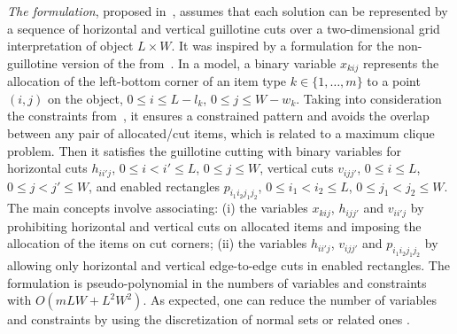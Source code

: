 \emph{The {\modelGrid} formulation}, proposed in~\citet{martin:2020}, assumes that each solution can be represented by a sequence of horizontal and vertical guillotine cuts over a two-dimensional grid interpretation of object $L \times W$.
It was inspired by a formulation for the non-guillotine version of the {\myproblem} from~\citet{beasley:1985:nonguillotine}.
In a {\modelGrid} model, a binary variable $x_{kij}$ represents the allocation of the left-bottom corner of an item type $k \in \{1,\ldots,m\}$ to a point $(i,j)$ on the object, $0 \leq i \leq L-l_k$, $0 \leq j \leq W-w_k$.
Taking into consideration the constraints from~\citet{beasley:1985:nonguillotine}, it ensures a constrained pattern and avoids the overlap between any pair of allocated/cut items, which is related to a maximum clique problem.
Then it satisfies the guillotine cutting with binary variables for horizontal cuts $h_{ii'j}$, $0 \leq i < i' \leq L$, $0 \leq j \leq W$, vertical cuts $v_{ijj'}$, $0 \leq i \leq L$, $0 \leq j < j' \leq W$, and enabled rectangles $p_{i_1 i_2 j_1 j_2}$, $0 \leq i_1 < i_2 \leq L$, $0 \leq j_1 < j_2 \leq W$.
The main concepts involve associating: 
(i) the variables $x_{kij}$, $h_{ijj'}$ and $v_{ii'j}$ by prohibiting horizontal and vertical cuts on allocated items and imposing the allocation of the items on cut corners; 
(ii) the variables $h_{ii'j}$, $v_{ijj'}$ and $p_{i_1 i_2 j_1 j_2}$ by allowing only horizontal and vertical edge-to-edge cuts in enabled rectangles.
The formulation is pseudo-polynomial in the numbers of variables and constraints with \(O(mLW+L^2W^2)\).
As expected, one can reduce the number of variables and constraints by using the discretization of normal sets or related ones \citet{herz:1972,cw:1977}.

